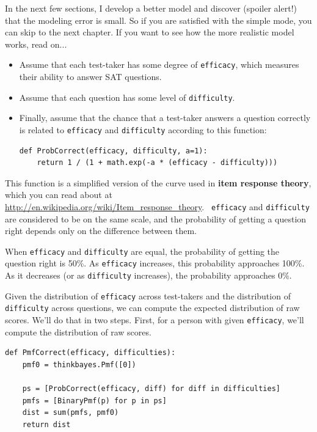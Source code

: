 \documentclass[12pt]{book}
\begin{document}
In the next few sections, I develop a better model and 
discover (spoiler alert!) that the modeling error is small.  So if
you are satisfied with the simple mode, you can skip to the next
chapter.  If you want to see how the more realistic model works,
read on...

\begin{itemize}

\item Assume that each test-taker has some 
  degree of {\tt efficacy}, which measures their
  ability to answer SAT questions.

\item Assume that each question has some level of
  {\tt difficulty}.

\item Finally, assume that the chance that a test-taker answers a
  question correctly is related to {\tt efficacy} and {\tt difficulty}
  according to this function:

\begin{verbatim}
def ProbCorrect(efficacy, difficulty, a=1):
    return 1 / (1 + math.exp(-a * (efficacy - difficulty)))
\end{verbatim}

\end{itemize}

This function is a simplified version of the curve used in {\bf item
response theory}, which you can read about at
\url{http://en.wikipedia.org/wiki/Item_response_theory}.  {\tt
  efficacy} and {\tt difficulty} are considered to be on the same
scale, and the probability of getting a question right depends only on
the difference between them.

When {\tt efficacy} and {\tt difficulty} are equal, the
probability of getting the question right is 50\%.  As
{\tt efficacy} increases, this probability approaches 100\%.
As it decreases (or as {\tt difficulty} increases), the
probability approaches 0\%.

Given the distribution of {\tt efficacy} across test-takers
and the distribution of {\tt difficulty} across questions, we
can compute the expected distribution of raw scores.  We'll do that
in two steps.  First, for a person with given {\tt efficacy},
we'll compute the distribution of raw scores.

\begin{verbatim}
def PmfCorrect(efficacy, difficulties):
    pmf0 = thinkbayes.Pmf([0])

    ps = [ProbCorrect(efficacy, diff) for diff in difficulties]
    pmfs = [BinaryPmf(p) for p in ps]
    dist = sum(pmfs, pmf0)
    return dist
\end{verbatim}
\end{document}
